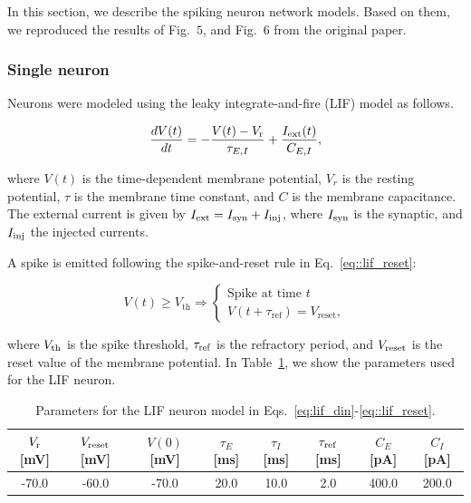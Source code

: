 In this section, we describe the spiking neuron network models. Based on them, we reproduced the results of Fig.~$5$, and Fig.~$6$ from the original paper.

\subsubsection{Single neuron}\label{lif_single} Neurons were modeled using the leaky integrate-and-fire (LIF) model  as
follows.

\begin{equation}
\frac{dV(t)}{dt} = -\frac{V(t) - V_{\rm r}}{\tau_{E,I}} + \frac{I_{\rm ext}(t)}{C_{E,I}},
\label{eq:lif_din}
\end{equation}  

\noindent where $V(t)$ is the time-dependent membrane potential, $V_r$ is the resting potential, $\tau$ is the membrane time constant, and $C$ is the membrane capacitance. The external current is given by $I_{\rm ext} = I_{\rm syn} + I_{\rm inj}$, where $I_{\rm syn}$ is the synaptic, and  $I_{\rm inj}$ the injected currents.

A spike is emitted following the spike-and-reset rule in Eq.~\ref{eq::lif_reset}:

\begin{equation}
V(t) \geq V_{\text{th}} \Rightarrow
\begin{cases}
\textrm{Spike at time $t$}\\
V(t + \tau_{\text{ref}}) = V_{\text{reset}},
\end{cases}
\label{eq::lif_reset}
\end{equation}

\noindent  where $V_{\rm th}$ is the spike threshold, $\tau_{\rm ref}$ is the refractory period, and $V_{\rm reset}$ is the reset value of the membrane potential. In Table~\ref{tab:table_lif}, we show the parameters used for the LIF neuron.

\begin{table}[!ht]
\centering
\begin{tabular}{|c|c|c|c|c|c|c|c|}
\hline
$V_{\rm r}$ {[}mV{]} & $V_{\rm reset}$ {[}mV{]} & $V(0)$ {[}mV{]} & $\tau_{E}$ {[}ms{]} & $\tau_{I}$ {[}ms{]} & $\tau_{\rm ref}$ {[}ms{]} & $C_{E}$ {[}pA{]} & $C_{I}$ {[}pA{]} \\ \hline
-70.0                & -60.0                    & -70.0           & 20.0                & 10.0                & 2.0                       & 400.0            & 200.0            \\ \hline
\end{tabular}
\caption{Parameters for the LIF neuron model in Eqs.~\ref{eq:lif_din}-\ref{eq::lif_reset}.}\label{tab:table_lif}
\end{table}



